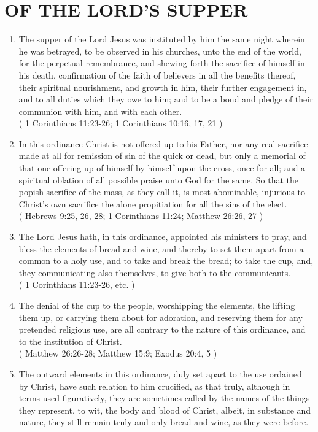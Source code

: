 \documentclass[12pt,a4paper]{book}
\begin{document}
\chapter{OF THE LORD'S SUPPER}
\label{ch-lor-sup}
\begin{enumerate}
\item
\label{ch-lor-sup-1}
The supper of the Lord Jesus was instituted by him the same night wherein he was betrayed, to be observed in his churches, unto the end of the world, for the perpetual remembrance, and shewing forth the sacrifice of himself in his death, confirmation of the faith of believers in all the benefits thereof, their spiritual nourishment, and growth in him, their further engagement in, and to all duties which they owe to him; and to be a bond and pledge of their communion with him, and with each other.\\
( 1 Corinthians 11:23-26; 1 Corinthians 10:16, 17, 21 )
\item
\label{ch-lor-sup-2}
In this ordinance Christ is not offered up to his Father, nor any real sacrifice made at all for remission of sin of the quick or dead, but only a memorial of that one offering up of himself by himself upon the cross, once for all; and a spiritual oblation of all possible praise unto God for the same. So that the popish sacrifice of the mass, as they call it, is most abominable, injurious to Christ's own sacrifice the alone propitiation for all the sins of the elect.\\
( Hebrews 9:25, 26, 28; 1 Corinthians 11:24; Matthew 26:26, 27 )
\item
\label{ch-lor-sup-3}
The Lord Jesus hath, in this ordinance, appointed his ministers to pray, and bless the elements of bread and wine, and thereby to set them apart from a common to a holy use, and to take and break the bread; to take the cup, and, they communicating also themselves, to give both to the communicants.\\
( 1 Corinthians 11:23-26, etc. )
\item
\label{ch-lor-sup-4}
The denial of the cup to the people, worshipping the elements, the lifting them up, or carrying them about for adoration, and reserving them for any pretended religious use, are all contrary to the nature of this ordinance, and to the institution of Christ.\\
( Matthew 26:26-28; Matthew 15:9; Exodus 20:4, 5 )
\item
\label{ch-lor-sup-5}
The outward elements in this ordinance, duly set apart to the use ordained by Christ, have such relation to him crucified, as that truly, although in terms used figuratively, they are sometimes called by the names of the things they represent, to wit, the body and blood of Christ, albeit, in substance and nature, they still remain truly and only bread and wine, as they were before.\\

\end{enumerate}
\end{document}
